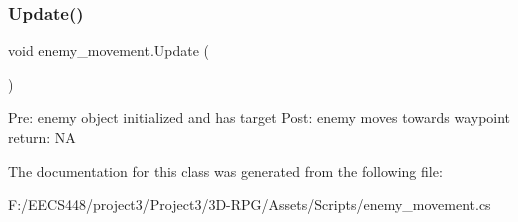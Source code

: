 \subsubsection{\texorpdfstring{Update()}{Update()}}
{\footnotesize\ttfamily void enemy\+\_\+movement.\+Update (\begin{DoxyParamCaption}{ }\end{DoxyParamCaption})\hspace{0.3cm}{\ttfamily [private]}}

Pre\+: enemy object initialized and has target Post\+: enemy moves towards waypoint return\+: NA 

The documentation for this class was generated from the following file\+:\begin{DoxyCompactItemize}
\item 
F\+:/\+E\+E\+C\+S448/project3/\+Project3/3\+D-\/\+R\+P\+G/\+Assets/\+Scripts/enemy\+\_\+movement.\+cs\end{DoxyCompactItemize}
